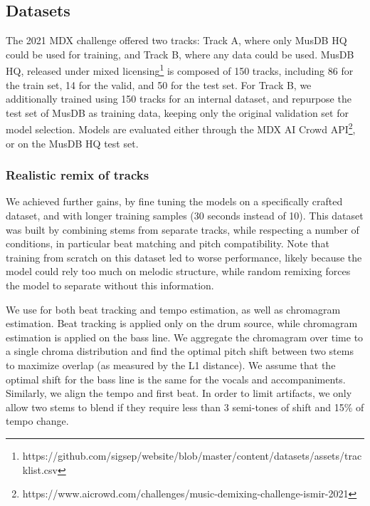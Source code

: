 \documentclass[10pt,a4paper,onecolumn]{article}
\let\textttOrig=\texttt
\def\texttt#1{\expandafter\textttOrig{\seqsplit{#1}}}
\begin{document}
\hypertarget{datasets}{%
\subsection{Datasets}\label{datasets}}

The 2021 MDX challenge \citep{mdx} offered two tracks: Track A, where
only MusDB HQ \citep{musdbhq} could be used for training, and Track B,
where any data could be used. MusDB HQ, released under mixed
licensing\footnote{https://github.com/sigsep/website/blob/master/content/datasets/assets/tracklist.csv}
is composed of 150 tracks, including 86 for the train set, 14 for the
valid, and 50 for the test set. For Track B, we additionally trained
using 150 tracks for an internal dataset, and repurpose the test set of
MusDB as training data, keeping only the original validation set for
model selection. Models are evaluated either through the MDX AI Crowd
API\footnote{https://www.aicrowd.com/challenges/music-demixing-challenge-ismir-2021},
or on the MusDB HQ test set.

\hypertarget{realistic-remix-of-tracks}{%
\subsubsection{Realistic remix of
tracks}\label{realistic-remix-of-tracks}}

We achieved further gains, by fine tuning the
models on a specifically crafted dataset, and with longer training
samples (30 seconds instead of 10). This dataset was built by combining
stems from separate tracks, while respecting a number of conditions, in
particular beat matching and pitch compatibility. Note that training
from scratch on this dataset led to worse performance, likely because
the model could rely too much on melodic structure, while random
remixing forces the model to separate without this information.

We use \texttt{librosa} \citep{librosa} for both beat tracking and tempo
estimation, as well as chromagram estimation. Beat tracking is applied
only on the drum source, while chromagram estimation is applied on the
bass line. We aggregate the chromagram over time to a single chroma
distribution and find the optimal pitch shift between two stems to
maximize overlap (as measured by the L1 distance). We assume that the
optimal shift for the bass line is the same for the vocals and
accompaniments. Similarly, we align the tempo and first beat. In order
to limit artifacts, we only allow two stems to blend if they require
less than 3 semi-tones of shift and 15\% of tempo change.
\end{document}
